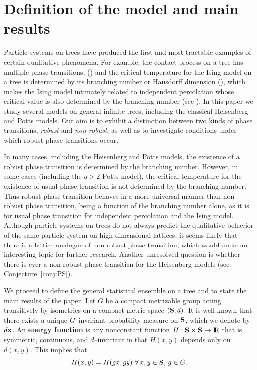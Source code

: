 \setcounter{equation}{0}

\section{Definition of the model and main results} \label{sec:one}

Particle systems on trees have produced the first and most tractable 
examples of certain qualitative phenomena.  For example, the
contact process on a tree has multiple phase transitions,
(\cite{Pem,Lig2,Sta}) and the critical temperature for the
Ising model on a tree is determined by its branching number or Hausdorff 
dimension (\cite{Ly1,EKPS,PP}), which makes the Ising model 
intimately related to independent percolation whose critical value is also
determined by the branching number (see \cite{Ly2}).  In this paper
we study several models on general infinite trees,
including the classical Heisenberg and Potts models.
Our aim is to exhibit a distinction between two kinds of phase transitions,
{\it robust} and {\it non-robust}, as well as to investigate conditions
under which robust phase transitions occur.  

In many cases, including the Heisenberg and Potts models,
the existence of a robust phase transition is determined 
by the branching number.  However, in some cases (including
the $q > 2$ Potts model), the critical temperature for 
the existence of usual phase transition is not determined by the 
branching number.  Thus robust phase transition 
behaves in a more universal manner than non-robust phase transition, 
being a function of the branching number alone,
as it is for usual phase transition for independent percolation and
the Ising model.  Although particle systems on trees do not always
predict the qualitative behavior of the same particle system on 
high-dimensional lattices, it seems likely that there is a
lattice analogue of non-robust phase transition, which would make
an interesting topic for further research.  Another unresolved question
is whether there is ever a non-robust phase transition for the Heisenberg
models (see Conjecture~\ref{conj:PS}).  

We proceed to define the general statistical ensemble 
on a tree and to state the main results of the paper.  
Let $G$ be a compact metrizable group acting transitively by isometries on 
a compact metric space $(\S,d)$.
It is well known that there exists a unique
$G$--invariant probability measure on $\S$, which we denote by $\dx$.  
An {\bf energy function} is any nonconstant function 
$H : \S \times \S \rightarrow \R$ that is symmetric, continuous,
and $d$--invariant in that $H(x,y)$ depends only on $d(x,y)$. This implies that
$$
H(x,y)=H(gx,gy) \,\,\forall \, x,y\in \S, \,g\in G.
$$

